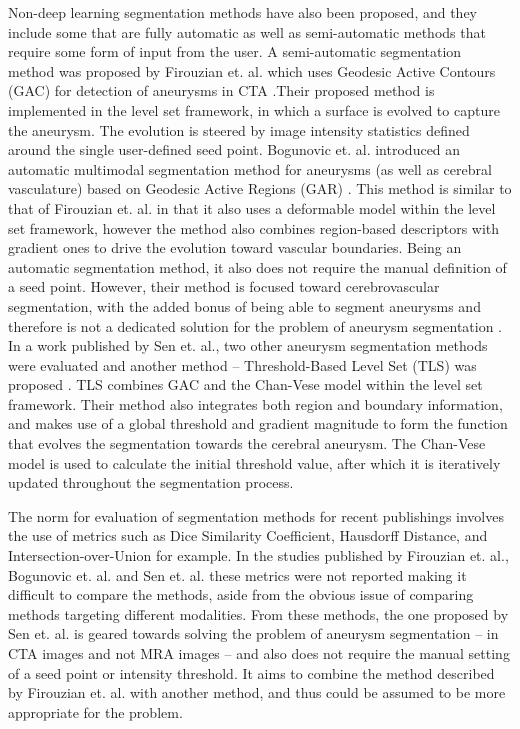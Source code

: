 Non-deep learning segmentation methods have also been proposed, and they include some that are fully automatic as well as semi-automatic methods that require some form of input from the user. A semi-automatic segmentation method was proposed by Firouzian et. al. which uses Geodesic Active Contours (GAC) for detection of aneurysms in CTA \cite{Firouzian2011}.Their proposed method is implemented in the level set framework, in which a surface is evolved to capture the aneurysm. The evolution is steered by image intensity statistics defined around the single user-defined seed point. Bogunovic et. al. introduced an automatic multimodal segmentation method for aneurysms (as well as cerebral vasculature) based on Geodesic Active Regions (GAR) \cite{Bogunovic2011}. This method is similar to that of Firouzian et. al. in that it also uses a deformable model within the level set framework, however the method also combines region-based descriptors with gradient ones to drive the evolution toward vascular boundaries. Being an automatic segmentation method, it also does not require the manual definition of a seed point. However, their method is focused toward cerebrovascular segmentation, with the added bonus of being able to segment aneurysms and therefore is not a dedicated solution for the problem of aneurysm segmentation . In a work published by Sen et. al., two other aneurysm segmentation methods were evaluated and another method -- Threshold-Based Level Set (TLS) was proposed \cite{Sen2013}. TLS combines GAC and the Chan-Vese model \cite{Chan2001} within the level set framework. Their method also integrates both region and boundary information, and makes use of a global threshold and gradient magnitude to form the function that evolves the segmentation towards the cerebral aneurysm. The Chan-Vese model is used to calculate the initial threshold value, after which it is iteratively updated throughout the segmentation process. 

The norm for evaluation of segmentation methods for recent publishings involves the use of metrics such as Dice Similarity Coefficient, Hausdorff Distance, and Intersection-over-Union for example. In the studies published by Firouzian et. al., Bogunovic et. al. and Sen et. al. these metrics were not reported making it difficult to compare the methods, aside from the obvious issue of comparing methods targeting different modalities. From these methods, the one proposed by Sen et. al. is geared towards solving the problem of aneurysm segmentation -- in CTA images and not MRA images --  and also does not require the manual setting of a seed point or intensity threshold. It aims to combine the method described by Firouzian et. al. with another method, and thus could be assumed to be more appropriate for the problem. 


